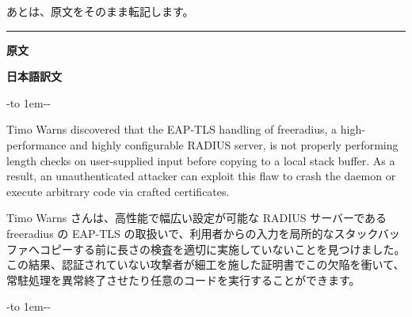 \documentclass[mingoth,a4paper]{jsarticle}
\begin{document}
あとは、原文をそのまま転記します。


\vspace{1ex}
\pagebreak[2]

\hrule
{}\par
\parbox[t]{0.48\linewidth}{{\bf 原文}}\hfil \parbox{0.48\linewidth}{\bf 日本語訳文}\par\vspace{0.1em}

-\leaders\hbox to 1em{\hss{}-\hss}\hfill -\par




\parbox[t]{0.47\linewidth}{
Timo Warns discovered that the EAP-TLS handling of freeradius, a high-performance and highly configurable RADIUS server, is not properly performing length checks on user-supplied input before copying to a local stack buffer.  As a result, an unauthenticated attacker can exploit this flaw to crash the daemon or execute arbitrary code via crafted certificates.
}\hfil
\parbox[t]{0.47\linewidth}{
Timo Warns さんは、高性能で幅広い設定が可能な RADIUS サーバーである freeradius の EAP-TLS の取扱いで、利用者からの入力を局所的なスタックバッファへコピーする前に長さの検査を適切に実施していないことを見つけました。この結果、認証されていない攻撃者が細工を施した証明書でこの欠陥を衝いて、常駐処理を異常終了させたり任意のコードを実行することができます。
}\hfil

-\leaders\hbox to 1em{\hss{}-\hss}\hfill -\par
\end{document}
